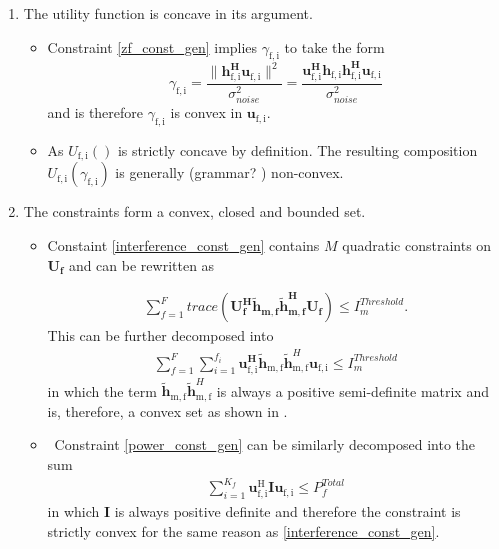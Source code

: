 \documentclass[12pt,a4paper]{report}
\begin{document}
\begin{enumerate}
\item The utility function is concave in its argument.
\begin{itemize}
\item 
Constraint \eqref{zf_const_gen} implies $\gamma_{\mathrm{f,i}}$ to take the form
	\begin{equation}\label{zf_snr}
	\gamma_{\mathrm{f,i}} = \frac{\|\mathbf{h^H_{\mathrm{f,i}}u_{\mathrm{f,i}}}\|^2}
	{\sigma^2_{noise}  
	}
	= 
	\frac{\mathbf{u^H_{\mathrm{f,i}}h_{\mathrm{f,i}}h^H_{\mathrm{f,i}}u_{\mathrm{f,i}}}}
	{\sigma^2_{noise}  
	}
	\end{equation}
and is therefore $\gamma_{\mathrm{f,i}}$ is convex in ${\mathbf{u}_{\mathrm{f,i}}}$. 
\item
As $U_{\mathrm{f,i}}() $ is strictly concave by definition.
The resulting composition $U_{\mathrm{f,i}}(\gamma_{\mathrm{f,i}}) $ is generally (grammar? ) non-convex.
\end{itemize}

\item
The constraints form a convex, closed and bounded set. 

\begin{itemize}

\item
	Constaint \eqref{interference_const_gen} contains $M$ quadratic constraints on $\mathbf{U_f}$ and 
	can be rewritten as 

\begin{gather*}
	\sum_{f=1}^F
	trace(\mathbf{U_f^H} \mathbf{\tilde{h}_{m,f}} \mathbf{\tilde{h}_{m,f}^H} \mathbf{U_f} )\leq 
	I^{Threshold}_{m}.
\end{gather*}
This can be further decomposed into  
	\begin{gather*}
	\sum_{f=1}^F
	\sum_{i=1}^{f_i}
	\mathbf{u_{\mathrm{f,i}}^H}\mathbf{\tilde{h}_{\mathrm{m,f}}} \mathbf{\tilde{h}}_{\mathrm{m,f}}^H
	\mathbf{u_{\mathrm{f,i}}} \leq I^{Threshold}_{m}
	\end{gather*}
in which the term $ \mathbf{\tilde{h}_{\mathrm{m,f}}} \mathbf{\tilde{h}}_{\mathrm{m,f}}^H$ is always a positive semi-definite matrix and is, therefore, a convex set as shown in 
\cite[p.8,9]{BoV:04}. 


\item \
	Constraint \eqref{power_const_gen} can be similarly decomposed into the sum
	\begin{gather*}
		\sum_{i=1}^{K_f}\mathbf{u_{\mathrm{f,i}}^{\mathrm{H}}} \mathbf{I} 		
		\mathbf{u_{\mathrm{f,i}}} \leq  P^{Total}_{f}
	\end{gather*}
	in which $\mathbf{I}$ is always positive definite and 			
	therefore the constraint is strictly convex for the same 		
	reason as \eqref{interference_const_gen}.
\end{itemize}


\end{enumerate}
\end{document}
